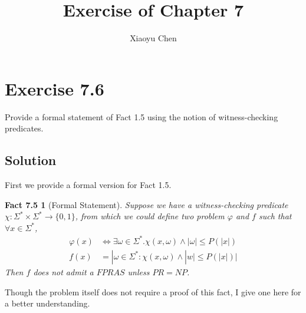 \documentclass{article}
\title{Exercise of Chapter 7}
\author{Xiaoyu Chen}
\date{}
\newtheorem*{fact7.5}{Fact 7.5}
\begin{document}
\maketitle

\section{Exercise 7.6}
Provide a formal statement of Fact 1.5 using the notion of witness-checking predicates.
\subsection{Solution}
First we provide a formal version for Fact 1.5.
\begin{fact7.5}[Formal Statement]
  Suppose we have a witness-checking predicate $\chi: \Sigma^*\times\Sigma^*\to \{0, 1\}$,
  from which we could define two problem $\varphi$ and $f$ such that $\forall x\in \Sigma^*$,
  \begin{align*}
    \varphi(x) &\Leftrightarrow \exists\omega\in\Sigma^*.\chi(x,\omega)\land|\omega|\leq P(|x|) \\
    f(x) &= |\omega\in\Sigma^*: \chi(x,\omega)\land |w|\leq P(|x|)|
  \end{align*}
  Then $f$ does not admit a $FPRAS$ unless $PR = NP$.
\end{fact7.5}
Though the problem itself does not require a proof of this fact,
I give one here for a better understanding.
\end{document}
